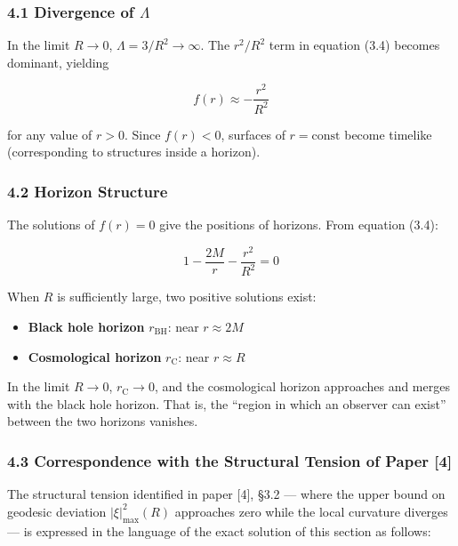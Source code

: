 \documentclass[a4paper,11pt]{article}
\theoremstyle{definition}
\providecommand{\tightlist}{\setlength{\itemsep}{0pt}\setlength{\parskip}{0pt}}
\begin{document}
\subsubsection{\texorpdfstring{4.1 Divergence of
\(\Lambda\)}{4.1 Divergence of \textbackslash Lambda}}\label{divergence-of-lambda}

In the limit \(R \to 0\), \(\Lambda = 3/R^2 \to \infty\). The
\(r^2/R^2\) term in equation (3.4) becomes dominant, yielding

\[f(r) \approx -\frac{r^2}{R^2} \tag{4.1}\]

for any value of \(r > 0\). Since \(f(r) < 0\), surfaces of
\(r = \text{const}\) become timelike (corresponding to structures inside
a horizon).

\subsubsection{4.2 Horizon Structure}\label{horizon-structure}

The solutions of \(f(r) = 0\) give the positions of horizons. From
equation (3.4):

\[1 - \frac{2M}{r} - \frac{r^2}{R^2} = 0 \tag{4.2}\]

When \(R\) is sufficiently large, two positive solutions exist:

\begin{itemize}
\tightlist
\item
  \textbf{Black hole horizon} \(r_{\mathrm{BH}}\): near \(r \approx 2M\)
\item
  \textbf{Cosmological horizon} \(r_{\mathrm{C}}\): near \(r \approx R\)
\end{itemize}

In the limit \(R \to 0\), \(r_{\mathrm{C}} \to 0\), and the cosmological
horizon approaches and merges with the black hole horizon. That is, the
``region in which an observer can exist'' between the two horizons
vanishes.

\subsubsection{4.3 Correspondence with the Structural Tension of Paper
{[}4{]}}\label{correspondence-with-the-structural-tension-of-paper-4}

The structural tension identified in paper {[}4{]}, §3.2 --- where the
upper bound on geodesic deviation \(|\xi|^2_{\max}(R)\) approaches zero
while the local curvature diverges --- is expressed in the language of
the exact solution of this section as follows:
\end{document}
